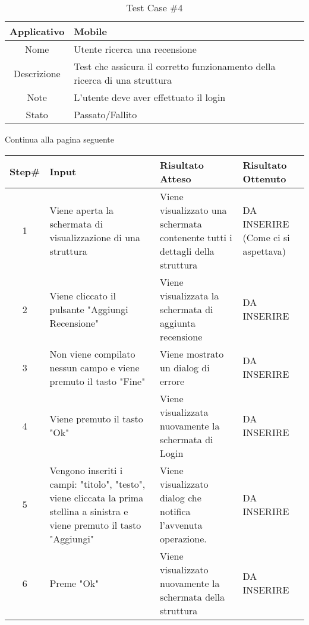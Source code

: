 
\begin{table}[H]
    \centering
    \footnotesize
    \caption{Test Case \#4}
    \begin{tabularx}{\textwidth}{|c|X|}
        \hline
        Applicativo & Mobile\\
        \hline
        Nome & Utente ricerca una recensione  \\
        \hline
        Descrizione & Test che assicura il corretto funzionamento della ricerca di una struttura\\
        \hline
        Note &  L'utente deve aver effettuato il login\\
        \hline
        Stato & Passato/Fallito\\
        \hline

    \end{tabularx}
    Continua alla pagina seguente
    \setlength{\tabcolsep}{8pt}
    \renewcommand{\arraystretch}{1.5}
\end{table}
\begin{table}[H]
    \footnotesize
    \begin{tabularx}{\textwidth}{|c|X|X|X|}
        \hline
        Step\# & Input & Risultato Atteso & Risultato Ottenuto \\
        \hline
         1 & Viene aperta la schermata di visualizzazione di una struttura
         & Viene visualizzato una schermata contenente tutti i dettagli della struttura
         &DA INSERIRE (Come ci si aspettava)\\
          \hline
        2 & Viene cliccato il pulsante "Aggiungi Recensione"
        & Viene visualizzata la schermata di aggiunta recensione
        & DA INSERIRE\\
         \hline 
        3 & Non viene compilato nessun campo e viene premuto il tasto "Fine"
         & Viene mostrato un dialog di errore & DA INSERIRE\\
          \hline
        4 & Viene premuto il tasto "Ok"
         & Viene visualizzata nuovamente la schermata di Login
         & DA INSERIRE\\
          \hline 
          5 & Vengono inseriti i campi: "titolo", "testo", viene cliccata la prima stellina a sinistra e viene premuto il tasto "Aggiungi"
         & Viene visualizzato dialog che notifica l'avvenuta operazione.
         & DA INSERIRE\\
          \hline 
          6 & Preme "Ok"
          & Viene visualizzato nuovamente la schermata della struttura
          & DA INSERIRE\\
           \hline                     
    \end{tabularx}
\end{table}
    
       
